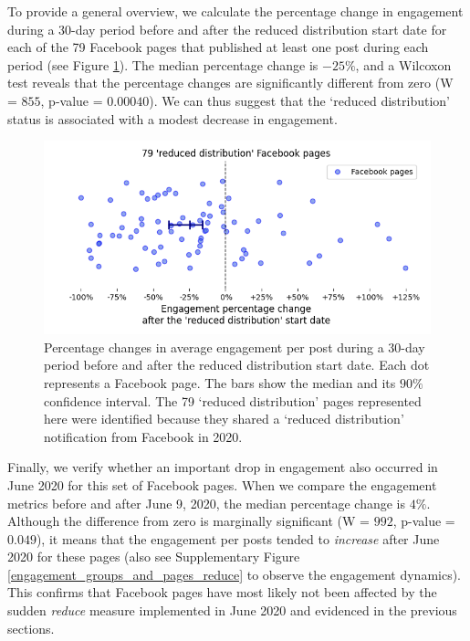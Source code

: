 \documentclass[review]{elsarticle}
\begin{document}
{To provide a general overview, we calculate the percentage change in engagement during a 30-day period before and after the reduced distribution start date for each of the 79 Facebook pages that published at least one post during each period (see Figure \ref{reduce_percentage_change}).
The median percentage change is $-25\%$, and a Wilcoxon test reveals that the percentage changes are significantly different from zero (W = $855$, p-value = $0.00040$).
We can thus suggest that the `reduced distribution' status is associated with a modest decrease in engagement.

\begin{figure}[!h]
\centering
\includegraphics[scale=0.5]{./../figure/reduce_percentage_change.png}
\caption{
Percentage changes in average engagement per post during a 30-day period before and after the reduced distribution start date. 
Each dot represents a Facebook page. 
The bars show the median and its $90\%$ confidence interval.
The 79 `reduced distribution' pages represented here were identified because they shared a `reduced distribution' notification from Facebook in 2020.
}
\label{reduce_percentage_change}
\end{figure}
 
Finally, we verify whether an important drop in engagement also occurred in June 2020 for this set of Facebook pages.
When we compare the engagement metrics before and after June 9, 2020, the median percentage change is $4\%$. Although the difference from zero is marginally significant (W = $992$, p-value = $0.049$), it means that the engagement per posts tended to {\it increase} after June 2020 for these pages (also see Supplementary Figure \ref{engagement_groups_and_pages_reduce} to observe the engagement dynamics).
This confirms that Facebook pages have most likely not been affected by the sudden {\it reduce} measure implemented in June 2020 and evidenced in the previous sections.

}
\end{document}
